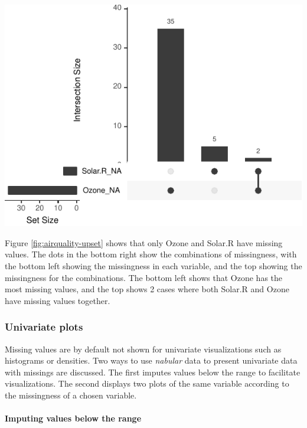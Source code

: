 \documentclass[]{article}
\let\oldparagraph\paragraph
\renewcommand{\paragraph}[1]{\oldparagraph{#1}\mbox{}}
\let\origfigure\figure
\let\endorigfigure\endfigure
\renewenvironment{figure}[1][2] {
    \expandafter\origfigure\expandafter[H]
} {
    \endorigfigure
}
\theoremstyle{definition}
\theoremstyle{definition}
\theoremstyle{definition}
\theoremstyle{remark}
\begin{document}
\begin{figure}

{\centering \includegraphics[width=0.8\linewidth]{tidy-missing-data-paper_files/figure-latex/airquality-upset-1} 

}

\caption{The pattern of missingness in the airquality dataset shown in an upset plot. Only Ozone and Solar.R have missing values, and Ozone has the most missing values. There are 2 cases where both Solar.R and Ozone have missing values.}\label{fig:airquality-upset}
\end{figure}

Figure \ref{fig:airquality-upset} shows that only Ozone and Solar.R have
missing values. The dots in the bottom right show the combinations of
missingness, with the bottom left showing the missingness in each
variable, and the top showing the missingness for the combinations. The
bottom left shows that Ozone has the most missing values, and the top
shows 2 cases where both Solar.R and Ozone have missing values together.

\hypertarget{univariate-plots}{%
\subsubsection{Univariate plots}\label{univariate-plots}}

Missing values are by default not shown for univariate visualizations
such as histograms or densities. Two ways to use \emph{nabular} data to
present univariate data with missings are discussed. The first imputes
values below the range to facilitate visualizations. The second displays
two plots of the same variable according to the missingness of a chosen
variable.

\hypertarget{imp-below-range}{%
\paragraph{Imputing values below the range}\label{imp-below-range}}
\end{document}

